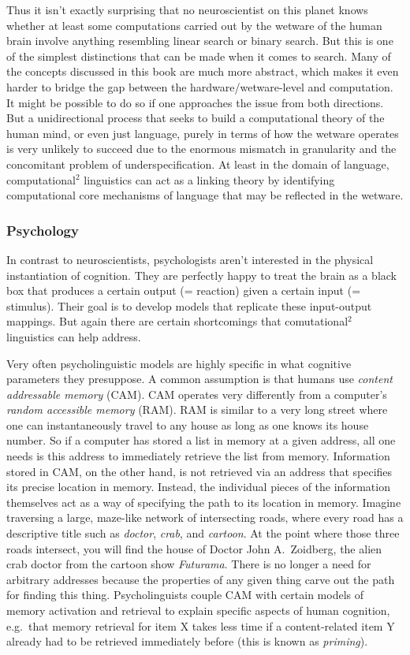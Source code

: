 Thus it isn't exactly surprising that no neuroscientist on this planet knows whether at least some computations carried out by the wetware of the human brain involve anything resembling linear search or binary search.
But this is one of the simplest distinctions that can be made when it comes to search.
Many of the concepts discussed in this book are much more abstract, which makes it even harder to bridge the gap between the hardware\slash wetware-level and computation.
It might be possible to do so if one approaches the issue from both directions.
But a unidirectional process that seeks to build a computational theory of the human mind, or even just language, purely in terms of how the wetware operates is very unlikely to succeed due to the enormous mismatch in granularity and the concomitant problem of underspecification.
At least in the domain of language, computational$^2$ linguistics can act as a linking theory by identifying computational core mechanisms of language that may be reflected in the wetware.


\subsubsection{Psychology}

In contrast to neuroscientists, psychologists aren't interested in the physical instantiation of cognition.
They are perfectly happy to treat the brain as a black box that produces a certain output (= reaction) given a certain input (= stimulus).
Their goal is to develop models that replicate these input-output mappings.
But again there are certain shortcomings that comutational$^2$ linguistics can help address.

Very often psycholinguistic models are highly specific in what cognitive parameters they presuppose.
A common assumption is that humans use \emph{content addressable memory} (CAM).
CAM operates very differently from a computer's \emph{random accessible memory} (RAM).
RAM is similar to a very long street where one can instantaneously travel to any house as long as one knows its house number.
So if a computer has stored a list in memory at a given address, all one needs is this address to immediately retrieve the list from memory.
Information stored in CAM, on the other hand, is not retrieved via an address that specifies its precise location in memory.
Instead, the individual pieces of the information themselves act as a way of specifying the path to its location in memory.
Imagine traversing a large, maze-like network of intersecting roads, where every road has a descriptive title such as \emph{doctor}, \emph{crab}, and \emph{cartoon}. 
At the point where those three roads intersect, you will find the house of Doctor John A.\ Zoidberg, the alien crab doctor from the cartoon show \emph{Futurama}.
There is no longer a need for arbitrary addresses because the properties of any given thing carve out the path for finding this thing.
Psycholinguists couple CAM with certain models of memory activation and retrieval to explain specific aspects of human cognition, e.g.\ that memory retrieval for item X takes less time if a content-related item Y already had to be retrieved immediately before (this is known as \emph{priming}).

